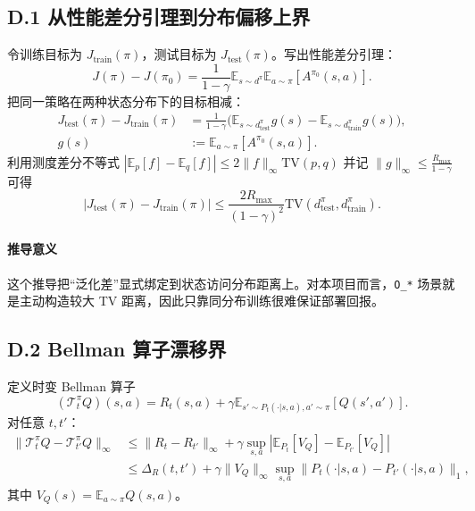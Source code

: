 ﻿\documentclass[11pt,a4paper]{ctexart}
\begin{document}
\subsection*{D.1 从性能差分引理到分布偏移上界}
令训练目标为 $J_{\text{train}}(\pi)$，测试目标为 $J_{\text{test}}(\pi)$。写出性能差分引理：
\begin{equation}
J(\pi)-J(\pi_0)=\frac{1}{1-\gamma}\mathbb{E}_{s\sim d^{\pi}}\mathbb{E}_{a\sim\pi}[A^{\pi_0}(s,a)].
\end{equation}
把同一策略在两种状态分布下的目标相减：
\begin{align}
J_{\text{test}}(\pi)-J_{\text{train}}(\pi)
&=\frac{1}{1-\gamma}\Big(
\mathbb{E}_{s\sim d^{\pi}_{\text{test}}}g(s)
-\mathbb{E}_{s\sim d^{\pi}_{\text{train}}}g(s)
\Big),\\
g(s)&:=\mathbb{E}_{a\sim\pi}[A^{\pi_0}(s,a)].
\end{align}
利用测度差分不等式
\(
|\mathbb{E}_p[f]-\mathbb{E}_q[f]|
\le 2\|f\|_\infty\mathrm{TV}(p,q)
\)
并记
\(
\|g\|_\infty\le \frac{R_{\max}}{1-\gamma}
\)
可得
\begin{equation}
|J_{\text{test}}(\pi)-J_{\text{train}}(\pi)|
\le
\frac{2R_{\max}}{(1-\gamma)^2}
\mathrm{TV}(d^{\pi}_{\text{test}},d^{\pi}_{\text{train}}).
\end{equation}

\paragraph{推导意义}
这个推导把“泛化差”显式绑定到状态访问分布距离上。对本项目而言，\texttt{O\_*} 场景就是主动构造较大 TV 距离，因此只靠同分布训练很难保证部署回报。

\subsection*{D.2 Bellman 算子漂移界}
定义时变 Bellman 算子
\begin{equation}
(\mathcal{T}^{\pi}_tQ)(s,a)=R_t(s,a)+\gamma\mathbb{E}_{s'\sim P_t(\cdot|s,a),a'\sim\pi}[Q(s',a')].
\end{equation}
对任意 $t,t'$：
\begin{align}
\|\mathcal{T}^{\pi}_tQ-\mathcal{T}^{\pi}_{t'}Q\|_\infty
&\le
\|R_t-R_{t'}\|_\infty
+\gamma\sup_{s,a}\left|
\mathbb{E}_{P_t}[V_Q]-\mathbb{E}_{P_{t'}}[V_Q]
\right|\\
&\le
\Delta_R(t,t')
+\gamma\|V_Q\|_\infty
\sup_{s,a}\|P_t(\cdot|s,a)-P_{t'}(\cdot|s,a)\|_1,
\end{align}
其中 $V_Q(s)=\mathbb{E}_{a\sim\pi}Q(s,a)$。
\end{document}
